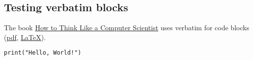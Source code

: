 \subsection{Testing verbatim blocks}

The book \href{http://www.greenteapress.com/thinkpython/}{How to Think Like a Computer Scientist} uses verbatim for code blocks (\href{http://www.greenteapress.com/thinkpython/thinkCSpy.pdf}{pdf}, \href{https://github.com/AllenDowney/ThinkPython/blob/master/book/book.tex}{LaTeX}).

\begin{verbatim}
print("Hello, World!")
\end{verbatim}
